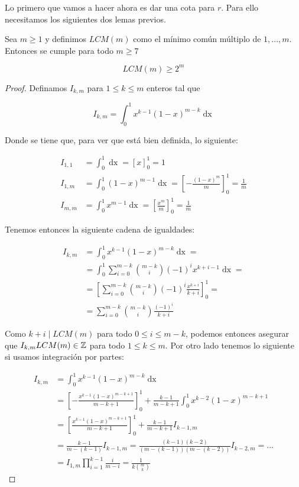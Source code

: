Lo primero que vamos a hacer ahora es dar una cota para $r$. Para ello necesitamos los siguientes dos lemas previos.

\begin{lema}\label{desigualdad_LCM}
	Sea $m \geq 1$ y definimos $LCM(m)$ como el mínimo común múltiplo de $1,...,m$. Entonces se cumple para todo $m \geq 7$
	
	\begin{equation}
		LCM(m) \geq 2^m
	\end{equation}
\end{lema}

\begin{proof}
	Definamos $I_{k,m}$ para $1 \leq k \leq m$ enteros tal que
	
	\begin{equation}
	I_{k,m} = \int_{0}^{1}x^{k-1}(1-x)^{m-k}\mathop{dx}
	\end{equation}
	
	Donde se tiene que, para ver que está bien definida, lo siguiente:
	
	\begin{align}
	I_{1,1} &= \int_{0}^{1}\mathop{dx} = \left[x\right]_0^1 = 1\\
	I_{1,m} &= \int_{0}^{1}(1-x)^{m-1}\mathop{dx} = \left[-\frac{(1-x)^m}{m}\right]_0^1 = \frac{1}{m}\\
	I_{m,m} &= \int_{0}^{1}x^{m-1}\mathop{dx} = \left[\frac{x^m}{m}\right]_0^1 = \frac{1}{m}
	\end{align}
	
	Tenemos entonces la siguiente cadena de igualdades:
	
	\begin{align}
	I_{k,m} &= \int_{0}^{1}x^{k-1}(1-x)^{m-k}\mathop{dx} =\\
	&= \int_{0}^{1}\sum_{i=0}^{m-k}\binom{m-k}{i}(-1)^ix^{k+i-1}\mathop{dx} =\\
	&= \left[\sum_{i=0}^{m-k}\binom{m-k}{i}(-1)^i\frac{x^{k+i}}{k+i}\right]_0^1 =\\
	&= \sum_{i=0}^{m-k}\binom{m-k}{i}\frac{(-1)^i}{k+i}
	\end{align}
	
	Como $k+i \mid LCM(m)$ para todo $0 \leq i \leq m-k$, podemos entonces asegurar que $I_{k,m}LCM(m) \in \mathbb{Z}$ para todo $1 \leq k \leq m$. Por otro lado tenemos lo siguiente si usamos integración por partes:
	
	\begin{align}
	I_{k,m} &= \int_{0}^{1}x^{k-1}(1-x)^{m-k}\mathop{dx}\\
	&= \left[-\frac{x^{k-1}(1-x)^{m-k+1}}{m-k+1}\right]_0^1 + \frac{k-1}{m-k+1}\int_{0}^{1}x^{k-2}(1-x)^{m-k+1}\\
	&= \left[\frac{x^{k-1}(1-x)^{m-k+1}}{m-k+1}\right]_0^1 + \frac{k-1}{m-k+1}I_{k-1,m}\\
	&= \frac{k-1}{m-(k-1)}I_{k-1,m} = \frac{(k-1)(k-2)}{(m-(k-1))(m-(k-2))}I_{k-2,m} =...\\
	&= I_{1,m}\prod_{i=1}^{k-1}\frac{i}{m-i} = \frac{1}{k\displaystyle\binom{m}{k}}
	\end{align}
	

\end{proof}

